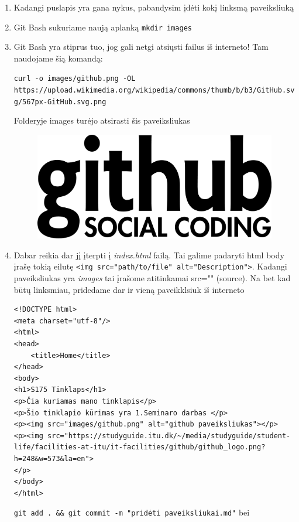 \documentclass[11pt,a4paper]{article}
\begin{document}
\begin{enumerate}
\item Kadangi puslapis yra gana nykus, pabandysim įdėti kokį linksmą paveiksliuką

\item Git Bash sukuriame naują aplanką \colorbox{listinggray}{\lstinline|mkdir images|}
\item Git Bash yra stiprus tuo, jog gali netgi atsiųsti failus iš interneto! Tam naudojame šią komandą: 

\colorbox{listinggray}{\lstinline|curl -o images/github.png -OL https://upload.wikimedia.org/wikipedia/commons/thumb/b/b3/GitHub.svg/567px-GitHub.svg.png
|}

Folderyje images turėjo atsirasti šis paveiksliukas

\begin{figure}[H]
\center
\includegraphics[scale=0.2]{github.png}
\end{figure}

\item Dabar reikia dar jį įterpti į \textit{index.html} failą. Tai galime padaryti html body įrašę tokią eilutę \colorbox{listinggray}{\lstinline|<img src="path/to/file" alt="Description">|}. Kadangi paveiksliukas yra \textit{images} tai įrašome atitinkamai src="" (source). Na bet kad būtų linksmiau, pridedame dar ir  vieną paveikklsiuk iš interneto 

\begin{lstlisting}
<!DOCTYPE html>
<meta charset="utf-8"/>
<html>
<head>
	<title>Home</title>
</head>
<body>
<h1>S175 Tinklaps</h1>
<p>Čia kuriamas mano tinklapis</p>
<p>Šio tinklapio kūrimas yra 1.Seminaro darbas </p>
<p><img src="images/github.png" alt="github paveiksliukas"></p>
<p><img src="https://studyguide.itu.dk/~/media/studyguide/student-life/facilities-at-itu/it-facilities/github/github_logo.png?h=248&w=573&la=en">
</p>
</body>
</html>
\end{lstlisting}

\colorbox{listinggray}{\lstinline|git add . && git commit -m "pridėti paveiksliukai.md"|} bei


\end{enumerate}
\end{document}
